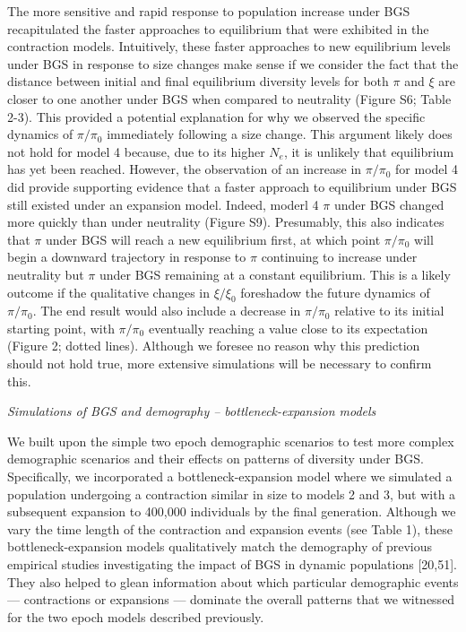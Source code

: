 \documentclass[9pt,twocolumn,twoside]{rilabRxiv}
\begin{document}
The more sensitive and rapid response to population increase under BGS
recapitulated the faster approaches to equilibrium that were exhibited
in the contraction models. Intuitively, these faster approaches to new
equilibrium levels under BGS in response to size changes make sense if
we consider the fact that the distance between initial and final
equilibrium diversity levels for both $\pi$ and $\xi$ are closer to one another
under BGS when compared to neutrality (Figure S6; Table 2-3). This
provided a potential explanation for why we observed the specific
dynamics of $\pi/\pi_0$ immediately following a size change.
This argument likely does not hold for model 4 because, due to its
higher $N_e$, it is unlikely that equilibrium has
yet been reached. However, the observation of an increase in
$\pi/\pi_0$ for model 4 did provide supporting evidence that a
faster approach to equilibrium under BGS still existed under an
expansion model. Indeed, moderl 4 $\pi$ under BGS changed more quickly than
under neutrality (Figure S9). Presumably, this also indicates that $\pi$
under BGS will reach a new equilibrium first, at which point
$\pi/\pi_0$ will begin a downward trajectory in response to $\pi$
continuing to increase under neutrality but $\pi$ under BGS remaining at a
constant equilibrium. This is a likely outcome if the qualitative
changes in $\xi/\xi_0$ foreshadow the future dynamics of
$\pi/\pi_0$. The end result would also include a decrease in
$\pi/\pi_0$ relative to its initial starting point, with
$\pi/\pi_0$ eventually reaching a value close to its
expectation (Figure 2; dotted lines). Although we foresee no reason why
this prediction should not hold true, more extensive simulations will be
necessary to confirm this.

\emph{Simulations of BGS and demography -- bottleneck-expansion models}

We built upon the simple two epoch demographic scenarios to test more
complex demographic scenarios and their effects on patterns of diversity
under BGS. Specifically, we incorporated a bottleneck-expansion model
where we simulated a population undergoing a contraction similar in size
to models 2 and 3, but with a subsequent expansion to 400,000
individuals by the final generation. Although we vary the time length of
the contraction and expansion events (see Table 1), these
bottleneck-expansion models qualitatively match the demography of
previous empirical studies investigating the impact of BGS in dynamic
populations [20,51]. They also helped to glean information about
which particular demographic events --- contractions or expansions --- dominate the overall patterns that we witnessed for the two epoch models described previously.
\end{document}
